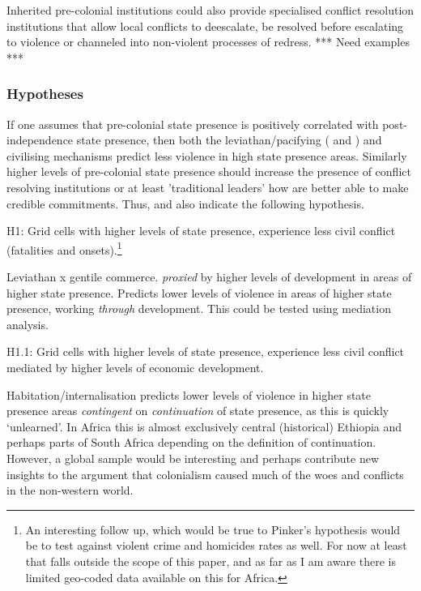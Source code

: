 \documentclass[12pt]{article}
\begin{document}
Inherited pre-colonial institutions could also provide specialised conflict
resolution institutions that allow local conflicts to deescalate, be resolved
before escalating to violence or channeled into non-violent processes of
redress. *** Need examples ***

\subsubsection{Hypotheses}

If one assumes that pre-colonial state presence is positively correlated with
post-independence state presence, then both the leviathan/pacifying
(\citet{Tilly1990} and \citet{Pinker2012}) and civilising \citep{Pinker2012}
mechanisms predict less violence in high state presence areas. Similarly higher
levels of pre-colonial state presence should increase the presence of conflict
resolving institutions or at least 'traditional leaders' how are better able to
make credible commitments. Thus, \citet{Wig2016} and
\citet{Depetris-Chauvin2016} also indicate the following hypothesis.

H1: Grid cells with higher levels of state presence, experience less civil
conflict (fatalities and onsets).\footnote{An interesting follow up, which would
	be true to Pinker's hypothesis would be to test against violent crime
	and homicides rates as well. For now at least that falls outside the
	scope of this paper, and as far as I am aware there is limited geo-coded
data available on this for Africa.}

Leviathan x gentile commerce. \textit{proxied} by higher levels of development
in areas of higher state presence. Predicts lower levels of violence in areas of
higher state presence, working \textit{through} development. This could be
tested using mediation analysis.

H1.1: Grid cells with higher levels of state presence, experience less civil
conflict mediated by higher levels of economic development.

Habitation/internalisation predicts lower levels of violence in higher state
presence areas \textit{contingent} on \textit{continuation} of state presence,
as this is quickly `unlearned'. In Africa this is almost exclusively central
(historical) Ethiopia and perhaps parts of South Africa depending on the
definition of continuation. However, a global sample would be interesting and
perhaps contribute new insights to the argument that colonialism caused much of
the woes and conflicts in the non-western world.
\end{document}
